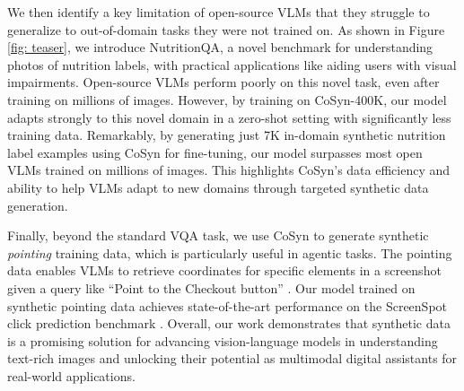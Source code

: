 We then identify a key limitation of open-source VLMs that they struggle to generalize to out-of-domain tasks they were not trained on.
As shown in Figure \ref{fig: teaser}, we introduce NutritionQA, a novel benchmark for understanding photos of nutrition labels, with practical applications like aiding users with visual impairments.
Open-source VLMs perform poorly on this novel task, even after training on millions of images. 
However, by training on CoSyn-400K, our model adapts strongly to this novel domain in a zero-shot setting with significantly less training data.
Remarkably, by generating just 7K in-domain synthetic nutrition label examples using CoSyn for fine-tuning, our model surpasses most open VLMs trained on millions of images. 
This highlights CoSyn’s data efficiency and ability to help VLMs adapt to new domains through targeted synthetic data generation.

Finally, beyond the standard VQA task, we use CoSyn to generate synthetic \textit{pointing} training data, which is particularly useful in agentic tasks. 
The pointing data enables VLMs to retrieve coordinates for specific elements in a screenshot given a query like ``Point to the Checkout button'' \citep{deitke2024molmo}.
Our model trained on synthetic pointing data achieves state-of-the-art performance on the ScreenSpot click prediction benchmark \citep{baechler2024screenai}.
Overall, our work demonstrates that synthetic data is a promising solution for advancing vision-language models in understanding text-rich images and unlocking their potential as multimodal digital assistants for real-world applications.